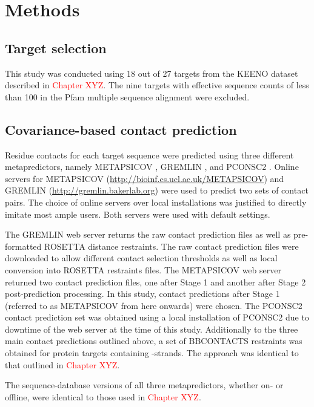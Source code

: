 \section{Methods}

\subsection{Target selection}
This study was conducted using 18 out of 27 targets from the KEENO dataset described in \textcolor{red}{Chapter XYZ}. The nine targets with effective sequence counts of less than 100 in the Pfam multiple sequence alignment were excluded.

\subsection{Covariance-based contact prediction}
Residue contacts for each target sequence were predicted using three different metapredictors, namely METAPSICOV \cite{Jones2015-wp}, GREMLIN \cite{Kamisetty2013-bs}, and PCONSC2 \cite{Skwark2014-mu}. Online servers for METAPSICOV (\url{http://bioinf.cs.ucl.ac.uk/METAPSICOV}) and GREMLIN (\url{http://gremlin.bakerlab.org}) were used to predict two sets of contact pairs. The choice of online servers over local installations was justified to directly imitate most \gls{ample} users. Both servers were used with default settings.

The GREMLIN web server returns the raw contact prediction files as well as pre-formatted ROSETTA distance restraints. The raw contact prediction files were downloaded to allow different contact selection thresholds as well as local conversion into ROSETTA restraints files. The METAPSICOV web server returned two contact prediction files, one after Stage 1 and another after Stage 2 post-prediction processing. In this study, contact predictions after Stage 1 (referred to as METAPSICOV from here onwards) were chosen. The PCONSC2 contact prediction set was obtained using a local installation of PCONSC2 due to downtime of the web server at the time of this study. Additionally to the three main contact predictions outlined above, a set of BBCONTACTS restraints was obtained for protein targets containing \textbeta-strands. The approach was identical to that outlined in \textcolor{red}{Chapter XYZ}.

The sequence-database versions of all three metapredictors, whether on- or offline, were identical to those used in \textcolor{red}{Chapter XYZ}.

